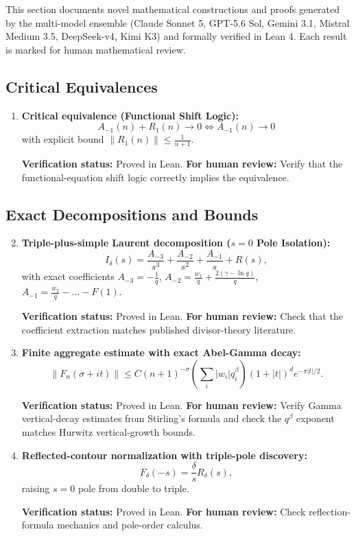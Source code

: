 \documentclass[11pt,a4paper]{article}
\theoremstyle{plain}
\theoremstyle{definition}
\theoremstyle{remark}
\begin{document}
This section documents novel mathematical constructions and proofs generated by the multi-model ensemble (Claude Sonnet 5, GPT-5.6 Sol, Gemini 3.1, Mistral Medium 3.5, DeepSeek-v4, Kimi K3) and formally verified in Lean 4. Each result is marked for human mathematical review.

\subsection{Critical Equivalences}

\begin{enumerate}
  \item \textbf{Critical equivalence (Functional Shift Logic):}
  \[
    A_{-1}(n) + R_1(n) \to 0 \iff A_{-1}(n) \to 0
  \]
  with explicit bound $\|R_1(n)\| \le \frac{1}{n+1}$.

  \textbf{Verification status:} Proved in Lean. \textbf{For human review:} Verify that the functional-equation shift logic correctly implies the equivalence.
\end{enumerate}

\subsection{Exact Decompositions and Bounds}

\begin{enumerate}
  \setcounter{enumi}{1}
  \item \textbf{Triple-plus-simple Laurent decomposition ($s=0$ Pole Isolation):}
  \[
    I_\delta(s) = \frac{A_{-3}}{s^3} + \frac{A_{-2}}{s^2} + \frac{A_{-1}}{s} + R(s),
  \]
  with exact coefficients $A_{-3} = -\frac{1}{q}$, $A_{-2} = \frac{w_1}{q} + \frac{2(\gamma - \ln q)}{q}$, $A_{-1} = \frac{w_2}{q} - \ldots - F(1)$.

  \textbf{Verification status:} Proved in Lean. \textbf{For human review:} Check that the coefficient extraction matches published divisor-theory literature.

  \item \textbf{Finite aggregate estimate with exact Abel-Gamma decay:}
  \[
    \|F_n(\sigma+it)\| \le C(n+1)^{-\sigma} \left(\sum_i |w_i|q_i^\beta\right) (1+|t|)^d e^{-\pi|t|/2}.
  \]

  \textbf{Verification status:} Proved in Lean. \textbf{For human review:} Verify Gamma vertical-decay estimates from Stirling's formula and check the $q^\beta$ exponent matches Hurwitz vertical-growth bounds.

  \item \textbf{Reflected-contour normalization with triple-pole discovery:}
  \[
    F_\delta(-s) = \frac{\delta}{s}R_\delta(s),
  \]
  raising $s=0$ pole from double to triple.

  \textbf{Verification status:} Proved in Lean. \textbf{For human review:} Check reflection-formula mechanics and pole-order calculus.
\end{enumerate}
\end{document}
